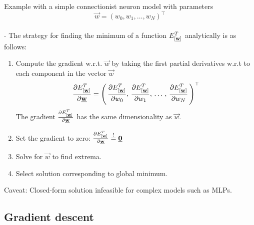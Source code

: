 \begin{frame}\frametitle{\subsecname}

    Example with a simple connectionist neuron model
    with parameters
    $$\vec w = (w_{0}, w_{1}, \ldots, w_{N})^{\top}$$\\


    - The strategy for finding the minimum of a function ${E}^T_{[\underline{\mathbf{w}}]}$ analytically is as follows:
    \pause
    \begin{enumerate}
    \item Compute the gradient w.r.t. $\vec w$ by taking the first partial derivatives w.r.t to each component in the vector $\vec w$
    \begin{equation}
        \frac{\partial {E}^T_{[\underline{\mathbf{w}}]}}{\partial \underline{\mathbf{w}}} = \left(\,
        \frac{\partial {E}^T_{[\underline{\mathbf{w}}]}}{\partial w_{0}}, \,
        \frac{\partial {E}^T_{[\underline{\mathbf{w}}]}}{\partial w_{1}}, \,\ldots\,,\, 
        \frac{\partial {E}^T_{[\underline{\mathbf{w}}]}}{\partial w_{N}}\,
        \right)^{\top}
        \label{eq:gradient_partial}
    \end{equation}
    The gradient $\frac{\partial {E}^T_{[\underline{\mathbf{w}}]}}{\partial \underline{\mathbf{w}}}$ has the same dimensionality as $\vec w$.
    \pause
    
    \item Set the gradient to zero: $\frac{\partial {E}^T_{[\underline{\mathbf{w}}]}}{\partial \underline{\mathbf{w}}} \stackrel{\mathrm{!}}{=} \underline{\mathbf{0}}$
    \item Solve for $\vec w$ to find extrema.
    \item Select solution corresponding to global minimum.
    
    \end{enumerate}
    
    Caveat: Closed-form solution infeasible for complex models such as MLPs.
    
\end{frame}

\subsection{Gradient descent}

